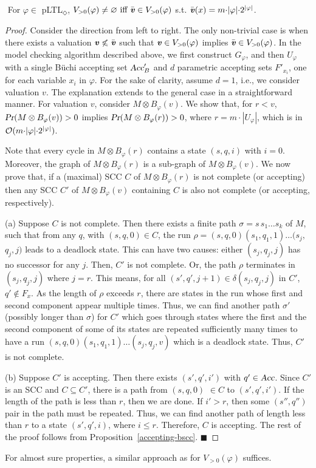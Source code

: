 \documentclass{llncs}
\def\Acc{\mbox{\sl Acc}}
\renewcommand{\Pr}{\mbox{\rm Pr}}
\renewcommand{\Pr}{\mbox{\sl Pr}}
\renewcommand{\leq}{\leqslant}
\renewcommand{\emptyset}{\varnothing}
\renewcommand{\a}[1]{\textbf{\textit{#1}}}
\newcommand{\de}{\Diamond}
\begin{document}
\begin{theorem}\label{th:pltld} 
$\!\!\!\!$ 
For $\varphi \in$ pLTL$_\de$, 
$V_{> 0}(\varphi) \neq \emptyset \mbox{ iff } \bar{{\a v}} \in V_{> 0}(\varphi)$ s.t. $\bar{{\a v}}(x) = m{\cdot}|\varphi|{\cdot}2^{|\varphi|}$.
\end{theorem}
\begin{proof} 
Consider the direction from left to right.
The only non-trivial case is when there exists a valuation ${\a v} \not\leq \bar{{\a v}}$ such that ${\a v}\in V_{>0}(\varphi)$ implies $\bar{{\a v}}\in V_{>0}(\varphi)$. 
In the model checking algorithm described above, we first construct $G_\varphi$, and then $U_\varphi$ with a single B\"uchi accepting set $\Acc'_B$ and $d$ parametric accepting sets $F'_{x_i}$, one for each variable $x_i$ in $\varphi$. 
For the sake of clarity, assume $d=1$, i.e., we consider valuation $v$.
The explanation extends to the general case in a straightforward manner.
For valuation $v$, consider $M \otimes B_\varphi(v)$. 
We show that, for $r < v$, $\Pr(M \otimes B_\varphi(v)) >0$ implies $\Pr(M\otimes B_\varphi(r)) >0$,
where $r = m{\cdot}|U_\varphi|$, which is in ${\cal O}(m{\cdot}|\varphi|{\cdot}2^{|\varphi|})$. 

Note that every cycle in $M \otimes B_\varphi(r)$ contains a state $(s,q,i)$ with $i=0$.
Moreover, the graph of $M \otimes B_\varphi(r)$ is a sub-graph of $M\otimes B_\varphi(v)$. 
We now prove that, if a (maximal) SCC $C$ of $M\otimes B_\varphi(r)$
is not complete (or accepting) then any SCC $C'$ of $M\otimes B_\varphi(v)$ containing $C$ is also not complete (or accepting, respectively).   

(a) Suppose $C$ is not complete. 
Then there exists a finite path $\sigma=s \, s_1 \ldots s_k$ of $M$, such that from any $q$, with $(s,q,0) \in C$, the run $\rho =(s,q,0)(s_1,q_1,1) \ldots (s_j,$ $q_j,j)$ leads to a deadlock state. 
This can have two causes: either $(s_j,q_j,j)$ has no successor for any $j$. 
Then, $C'$ is not complete.
Or, the path $\rho$ terminates in $(s_j,q_j,j)$ where $j=r$.
This means, for all $(s',q',j{+}1) \in \delta(s_j,q_j,j)$ in $C'$, $q' \not\in F_x$. 
As the length of $\rho$ exceeds $r$, there are states in the run whose first and second component appear multiple times.
Thus, we can find another path $\sigma'$ (possibly longer than $\sigma$) for $C'$ which goes through states where the first and the second component of some of its states are repeated sufficiently many times to have a run $(s,q,0)(s_1,q_1,1)\ldots(s_j,q_j,v)$ which is a deadlock state. 
Thus, $C'$ is not complete.
 
(b) Suppose $C'$ is accepting. 
Then there exists $(s',q',i')$ with $q'\in \Acc$. 
Since $C'$ is an SCC and $C\subseteq C'$, there is a path from $(s,q,0)$  $\in C$ to $(s',q',i')$. 
If the length of the path is less than $r$, then we are done. 
If $i'>r$, then some $(s'',q'')$ pair in the path must be repeated. 
Thus, we can find another path of length less than $r$ to a state $(s',q',i)$, where $i \leq r$. 
Therefore, $C$ is accepting. 
The rest of the proof follows from Proposition~\ref{accepting-bscc}.
\hfill $\blacksquare$
\end{proof}
For almost sure properties, a similar approach as for $V_{>0}(\varphi)$ suffices.
\end{document}
